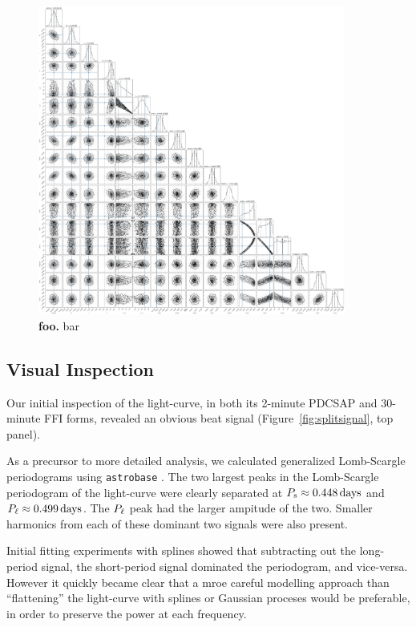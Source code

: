 \documentclass[12pt,twocolumn,tighten]{aastex62}
\begin{document}
\begin{figure}[t]
	\begin{center}
		\leavevmode
		\includegraphics[width=0.9\textwidth]{f5_comp.png}
	\end{center}
	\vspace{-0.7cm}
	\caption{ {\bf foo.}
    bar
		\label{fig:corner}
	}
\end{figure}


\subsection{Visual Inspection}

Our initial inspection of the light-curve, in both its 2-minute PDCSAP
and 30-minute FFI forms, revealed an obvious beat signal
(Figure~\ref{fig:splitsignal}, top panel).

As a precursor to more detailed analysis, we calculated generalized
Lomb-Scargle periodograms using \texttt{astrobase}
\citep{lomb_1976,scargle_studies_1982,vanderplas_periodograms_2015,bhatti_astrobase_2018}. 
The two largest peaks in the Lomb-Scargle periodogram of the
light-curve were clearly separated at $P_{\rm s} \approx 0.448\,{\rm
days}$ and $P_{\rm \ell} \approx 0.499\,{\rm days}$.
The $P_{\rm \ell}$ peak had the larger ampitude of the two.
Smaller harmonics from each of these dominant two signals were also
present.

Initial fitting experiments with splines showed that subtracting out
the long-period signal, the short-period signal dominated the
periodogram, and vice-versa.
However it quickly became clear that a mroe careful modelling approach
than ``flattening'' the light-curve with splines or Gaussian proceses
would be preferable, in order to preserve the power at each frequency.
\end{document}
